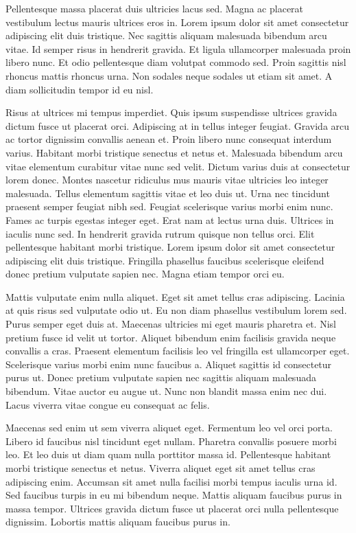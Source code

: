 \documentclass[11pt,a4paper]{article}
\begin{document}
Pellentesque massa placerat duis ultricies lacus sed. Magna ac placerat vestibulum lectus mauris ultrices eros in. Lorem ipsum dolor sit amet consectetur adipiscing elit duis tristique. Nec sagittis aliquam malesuada bibendum arcu vitae. Id semper risus in hendrerit gravida. Et ligula ullamcorper malesuada proin libero nunc. Et odio pellentesque diam volutpat commodo sed. Proin sagittis nisl rhoncus mattis rhoncus urna. Non sodales neque sodales ut etiam sit amet. A diam sollicitudin tempor id eu nisl.

Risus at ultrices mi tempus imperdiet. Quis ipsum suspendisse ultrices gravida dictum fusce ut placerat orci. Adipiscing at in tellus integer feugiat. Gravida arcu ac tortor dignissim convallis aenean et. Proin libero nunc consequat interdum varius. Habitant morbi tristique senectus et netus et. Malesuada bibendum arcu vitae elementum curabitur vitae nunc sed velit. Dictum varius duis at consectetur lorem donec. Montes nascetur ridiculus mus mauris vitae ultricies leo integer malesuada. Tellus elementum sagittis vitae et leo duis ut. Urna nec tincidunt praesent semper feugiat nibh sed. Feugiat scelerisque varius morbi enim nunc. Fames ac turpis egestas integer eget. Erat nam at lectus urna duis. Ultrices in iaculis nunc sed. In hendrerit gravida rutrum quisque non tellus orci. Elit pellentesque habitant morbi tristique. Lorem ipsum dolor sit amet consectetur adipiscing elit duis tristique. Fringilla phasellus faucibus scelerisque eleifend donec pretium vulputate sapien nec. Magna etiam tempor orci eu.

Mattis vulputate enim nulla aliquet. Eget sit amet tellus cras adipiscing. Lacinia at quis risus sed vulputate odio ut. Eu non diam phasellus vestibulum lorem sed. Purus semper eget duis at. Maecenas ultricies mi eget mauris pharetra et. Nisl pretium fusce id velit ut tortor. Aliquet bibendum enim facilisis gravida neque convallis a cras. Praesent elementum facilisis leo vel fringilla est ullamcorper eget. Scelerisque varius morbi enim nunc faucibus a. Aliquet sagittis id consectetur purus ut. Donec pretium vulputate sapien nec sagittis aliquam malesuada bibendum. Vitae auctor eu augue ut. Nunc non blandit massa enim nec dui. Lacus viverra vitae congue eu consequat ac felis.

Maecenas sed enim ut sem viverra aliquet eget. Fermentum leo vel orci porta. Libero id faucibus nisl tincidunt eget nullam. Pharetra convallis posuere morbi leo. Et leo duis ut diam quam nulla porttitor massa id. Pellentesque habitant morbi tristique senectus et netus. Viverra aliquet eget sit amet tellus cras adipiscing enim. Accumsan sit amet nulla facilisi morbi tempus iaculis urna id. Sed faucibus turpis in eu mi bibendum neque. Mattis aliquam faucibus purus in massa tempor. Ultrices gravida dictum fusce ut placerat orci nulla pellentesque dignissim. Lobortis mattis aliquam faucibus purus in.
\end{document}
